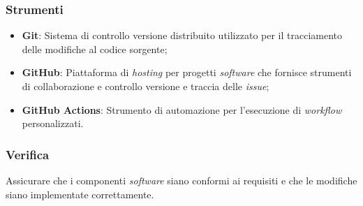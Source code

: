 \subsubsection*{Strumenti}
\begin{itemize}
	\item \textbf{Git}: Sistema di controllo versione distribuito utilizzato per
	      il tracciamento delle modifiche al codice sorgente;
	\item \textbf{GitHub\g}: Piattaforma di \textit{hosting} per progetti \textit{software}
	      che fornisce strumenti di collaborazione e controllo versione e
	      traccia delle \textit{issue\g};
	\item \textbf{GitHub Actions}: Strumento di automazione per l'esecuzione di
	      \textit{workflow} personalizzati.
\end{itemize}



\subsubsection{Verifica} 
Assicurare che i componenti \textit{software} siano conformi ai requisiti e che 
le modifiche siano implementate correttamente.




